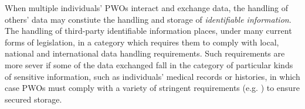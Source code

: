 \documentclass{acm_proc_article-sp}
\begin{document}
When multiple individuals' PWOs interact and exchange data, the handling of others' data may constiute the handling and storage of \emph{identifiable information}\cite{narayanan2010myths}. The handling of third-party identifiable information places, under many current forms of legislation, in a category which requires them to comply with local, national and international data handling requirements. Such requirements are more sever if some of the data exchanged fall in the category of particular kinds of sensitive information, such as individuals' medical records or histories, in which case PWOs must comply with a variety of stringent requirements (e.g. \cite{banisar1999global}) to ensure secured storage.  


\end{document}
